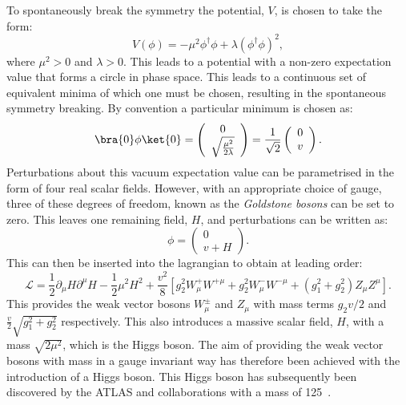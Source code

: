 To spontaneously break the symmetry the potential, $V$, is chosen to
take the form:
\begin{equation}
\label{eq:higgsPot}
V(\phi)=-\mu^{2}\phi^{\dag}\phi+\lambda\left(\phi^{\dag}\phi\right)^{2},
\end{equation}
where $\mu^2>0$ and $\lambda>0$. This leads to a potential with a
non-zero expectation value that forms a circle in phase space. This
leads to a continuous set of equivalent minima of which one must be
chosen, resulting in the spontaneous symmetry breaking. By convention a
particular minimum is chosen as:
\begin{equation}
\bra{0}\phi\ket{0}=\left(\begin{array}{c} 0 \\ \sqrt{\frac{\mu^{2}}{2\lambda}} \end{array}\right)=\frac{1}{\sqrt{2}}\left(\begin{array}{c} 0 \\ v \end{array}\right).
\end{equation}
Perturbations about this vacuum expectation value can be parametrised
in the form of four real scalar fields. However, with an appropriate
choice of gauge, three of these degrees of freedom, known as the
\emph{Goldstone bosons} can be set to zero. This leaves one remaining
field, $H$, and perturbations can be written as:
\begin{equation}
  \phi=\left(\begin{array}{c}0 \\ v+H \end{array}\right).
\end{equation}
This can then be inserted into the lagrangian to obtain at leading
order:
\begin{equation}
  \mathcal{L}=\frac{1}{2}\partial_{\mu}H\partial^{\mu}H-\frac{1}{2}\mu^{2}H^{2}+\frac{v^{2}}{8}\left[g_{2}^{2}W_{\mu}^{+}W^{+\mu}+g_{2}^{2}W_{\mu}^{-}W^{-\mu}+\left(g_{1}^{2}+g_{2}^{2}\right)Z_{\mu}Z^{\mu}\right].
\end{equation}
This provides the weak vector bosons $W_{\mu}^{\pm}$ and $Z_{\mu}$
with mass terms $g_2v/2$ and $\frac{v}{2}\sqrt{g_1^2+g_2^2}$
respectively. This also introduces a massive scalar field, $H$, with a
mass $\sqrt{2\mu^2}$, which is the Higgs boson. The aim of providing
the weak vector bosons with mass in a gauge invariant way has
therefore been achieved with the introduction of a Higgs boson. This
Higgs boson has subsequently been discovered by the ATLAS and \CMS
collaborations with a mass of 125~\gev \cite{1207.7214,1207.7235}.


